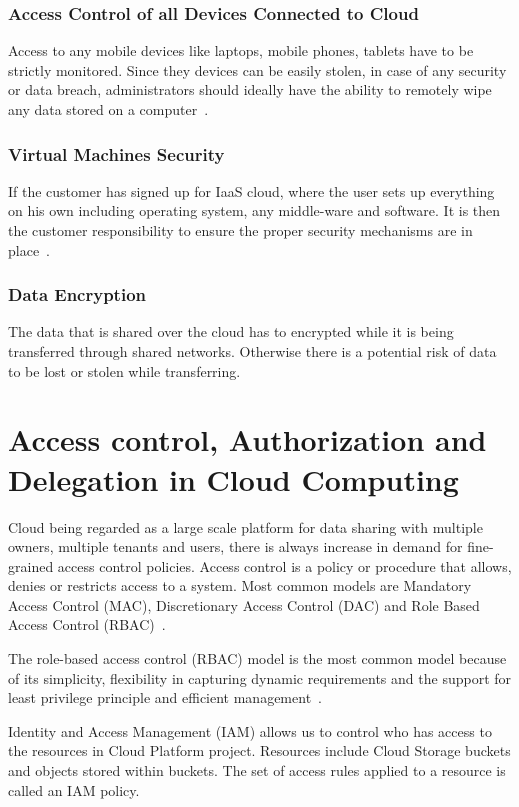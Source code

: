 \subsubsection{Access Control of all Devices Connected to Cloud}
Access to any mobile devices like laptops, mobile phones, tablets have to be 
strictly monitored. Since they devices can be easily stolen, in case of any 
security or data breach, administrators should ideally have the ability 
to remotely wipe any data stored on a computer~\cite{hid-sp18-513-diversity}.

\subsubsection{Virtual Machines Security}
If the customer has signed up for IaaS cloud, where the user sets up
everything on his own including operating system, any middle-ware
and software. It is then the customer responsibility to ensure the
proper security mechanisms are in place~\cite{hid-sp18-513-diversity}.
\subsubsection{Data Encryption}
The data that is shared over the cloud has to encrypted while it 
is being transferred through shared networks. Otherwise there is a 
potential risk of data to be lost or stolen while transferring.

\section{Access control, Authorization and Delegation in Cloud Computing}
Cloud being regarded as a large scale platform for data sharing with 
multiple owners, multiple tenants and users, there is always increase in
demand for fine-grained access control policies. Access control is a policy 
or procedure that allows, denies or restricts access to a system. Most
common models are Mandatory Access Control (MAC), Discretionary Access 
Control (DAC) and Role Based Access Control (RBAC)~\cite{hid-sp18-513-accesscntrl}.

The role-based access control (RBAC) model is the most common 
model because of its simplicity, flexibility in capturing dynamic 
requirements and the support for least privilege principle 
and efficient management~\cite{hid-sp18-513-cloud3}. 

Identity and Access Management (IAM) allows us to control who has access 
to the resources in Cloud Platform project. Resources include Cloud Storage 
buckets and objects stored within buckets. The set of access rules 
applied to a resource is called an IAM policy. 

